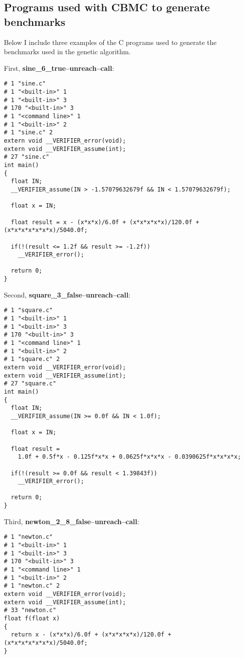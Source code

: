 \begin{appendices}
\section{Programs used with CBMC to generate benchmarks}

Below I include three examples of the C programs used to generate the benchmarks used in the genetic algorithm.

\begin{samepage}
First, {\bf sine\_6\_true--unreach--call}:
\begin{lstlisting}[c]
# 1 "sine.c"
# 1 "<built-in>" 1
# 1 "<built-in>" 3
# 170 "<built-in>" 3
# 1 "<command line>" 1
# 1 "<built-in>" 2
# 1 "sine.c" 2
extern void __VERIFIER_error(void);
extern void __VERIFIER_assume(int);
# 27 "sine.c"
int main()
{
  float IN;
  __VERIFIER_assume(IN > -1.57079632679f && IN < 1.57079632679f);

  float x = IN;

  float result = x - (x*x*x)/6.0f + (x*x*x*x*x)/120.0f + (x*x*x*x*x*x*x)/5040.0f;

  if(!(result <= 1.2f && result >= -1.2f))
    __VERIFIER_error();

  return 0;
}
\end{lstlisting}
\end{samepage}

\begin{samepage}
Second, {\bf square\_3\_false--unreach--call}:
\begin{lstlisting}[c]
# 1 "square.c"
# 1 "<built-in>" 1
# 1 "<built-in>" 3
# 170 "<built-in>" 3
# 1 "<command line>" 1
# 1 "<built-in>" 2
# 1 "square.c" 2
extern void __VERIFIER_error(void);
extern void __VERIFIER_assume(int);
# 27 "square.c"
int main()
{
  float IN;
  __VERIFIER_assume(IN >= 0.0f && IN < 1.0f);

  float x = IN;

  float result =
    1.0f + 0.5f*x - 0.125f*x*x + 0.0625f*x*x*x - 0.0390625f*x*x*x*x;

  if(!(result >= 0.0f && result < 1.39843f))
    __VERIFIER_error();

  return 0;
}
\end{lstlisting}
\end{samepage}

\begin{samepage}
Third, {\bf newton\_2\_8\_false--unreach--call}:
\begin{lstlisting}[c]
# 1 "newton.c"
# 1 "<built-in>" 1
# 1 "<built-in>" 3
# 170 "<built-in>" 3
# 1 "<command line>" 1
# 1 "<built-in>" 2
# 1 "newton.c" 2
extern void __VERIFIER_error(void);
extern void __VERIFIER_assume(int);
# 33 "newton.c"
float f(float x)
{
  return x - (x*x*x)/6.0f + (x*x*x*x*x)/120.0f + (x*x*x*x*x*x*x)/5040.0f;
}


\end{lstlisting}
\end{samepage}
\end{appendices}
